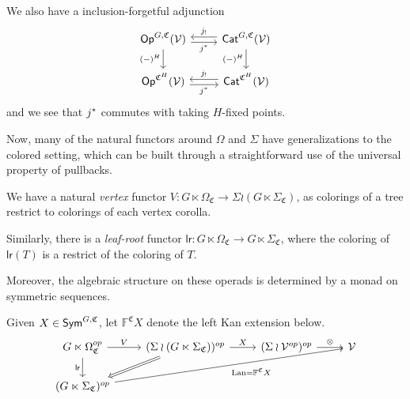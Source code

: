 \documentclass[a4paper,10pt
,draft
]{article}%
\renewcommand{\1}{\ensuremath{\mathbb{id}}}
\begin{document}
\begin{remark}
      We also have a inclusion-forgetful adjunction
      \begin{equation}
            \label{JSTAR_CAT_EQ}
            \begin{tikzcd}
                  \Op^{G, \mathfrak C}(\V) \arrow[r, shift right, "j^{\**}"'] \arrow[d, "{(-)^H}"']
                  &
                  \Cat^{G, \mathfrak C}(\V) \arrow[l, shift right, "j_!"'] \arrow[d, "{(-)^H}"']
                  \\
                  \Op^{\mathfrak C^H}(\V)  \arrow[r, shift right, "j^{\**}"']
                  &
                  \Cat^{\mathfrak C^H}(\V) \arrow[l, shift right, "j_!"']
            \end{tikzcd}
      \end{equation}
      and we see that $j^{\**}$ commutes with taking $H$-fixed points.
\end{remark}

Now, many of the natural functors around $\Omega$ and $\Sigma$ have generalizations to the colored setting,
which can be built through a straightforward use of the universal property of pullbacks.

\begin{definition}
      We have a natural \textit{vertex} functor
      $V: G \ltimes \Omega_{\mathfrak C} \to \Sigma \wr (G \ltimes \Sigma_{\mathfrak C})$,
      as colorings of a tree restrict to colorings of each vertex corolla.

      Similarly, there is a \textit{leaf-root} functor
      $\mathsf{lr}: G \ltimes \Omega_{\mathfrak C} \to G \ltimes \Sigma_{\mathfrak C}$,
      where the coloring of $\mathsf{lr}(T)$ is a restrict of the coloring of $T$.
\end{definition}



Moreover, the algebraic structure on these operads is determined by a monad on symmetric sequences.

\begin{definition}
      Given $X \in \mathsf{Sym}^{G, \mathfrak C}$, let $\mathbb F^{\mathfrak C} X$ denote the left Kan extension below.
      \begin{equation} 
           \begin{tikzcd}
                  G \ltimes \Omega_{\mathfrak C}^{op}
                  \arrow[d, "\mathsf{lr}"']
                  \arrow[r, "V"]
                  &
                  (\Sigma \wr (G \ltimes \Sigma_{\mathfrak C}))^{op} \arrow[r, "X"]
                  \arrow[dl, Rightarrow]
                  &
                  (\Sigma \wr \V^{op})^{op} \arrow[r, "\otimes"]
                  &
                  \V
                  \\
                  (G \ltimes \Sigma_{\mathfrak C})^{op} \arrow[urrr, "\Lan = \mathbb F^{\mathfrak C} X"']
            \end{tikzcd}
      \end{equation}
\end{definition}
\end{document}
